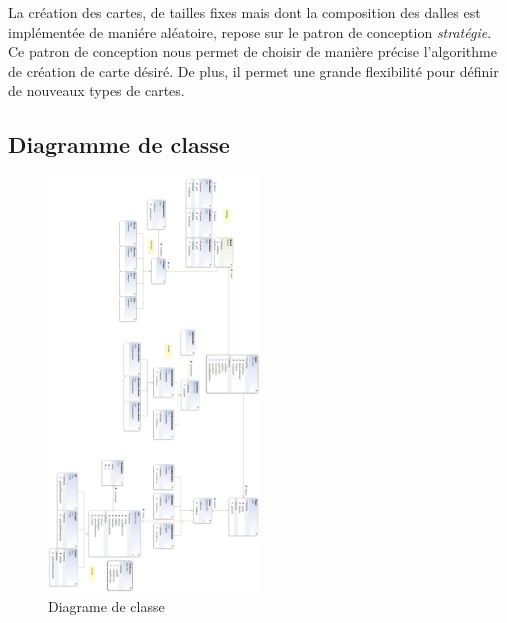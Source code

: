 
		La création des cartes, de tailles fixes mais dont la composition des dalles est implémentée de maniére aléatoire, repose sur le patron de conception \emph{stratégie}. Ce patron de conception nous permet de choisir de manière précise l'algorithme de création de carte désiré. De plus, il permet une grande flexibilité pour définir de nouveaux types de cartes.



	\subsection{Diagramme de classe}


	\begin{figure}
		\begin{center}
			\includegraphics[width=0.5\textwidth]{figure/entire_class_diagram.png}
		\end{center}
		\caption{Diagrame de classe}
		\label{fig:planif}
	\end{figure}




